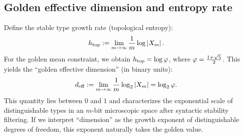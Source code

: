 \subsection{Golden effective dimension and entropy rate}

Define the stable type growth rate (topological entropy):
\[
h_{\mathrm{top}}:=\lim_{m\to\infty}\frac{1}{m}\log \left\lvert X_m\right\rvert.
\]
For the golden mean constraint, we obtain $h_{\mathrm{top}}=\log\varphi$, where $\varphi=\frac{1+\sqrt5}{2}$. This yields the ``golden effective dimension'' (in binary units):
\[
d_{\mathrm{eff}}:=\lim_{m\to\infty}\frac{1}{m}\log_2\left\lvert X_m\right\rvert=\log_2\varphi.
\]
This quantity lies between $0$ and $1$ and characterizes the exponential scale of distinguishable types in an $m$-bit microscopic space after syntactic stability filtering. If we interpret ``dimension'' as the growth exponent of distinguishable degrees of freedom, this exponent naturally takes the golden value.
